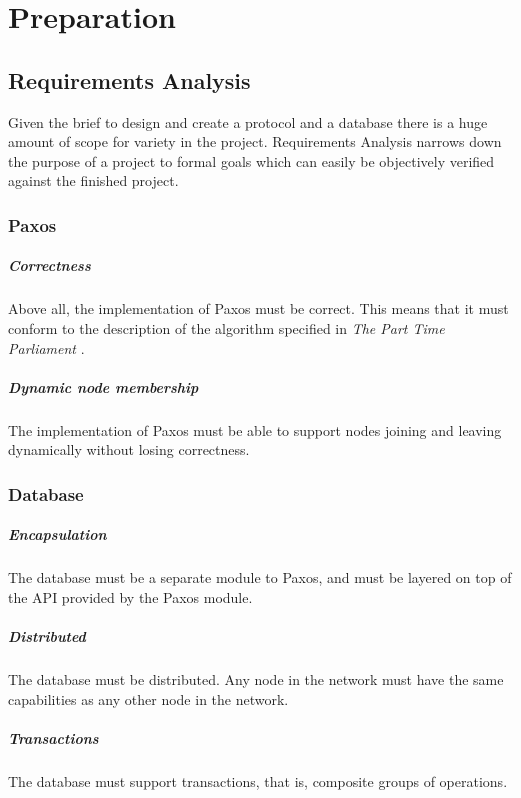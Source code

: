 \documentclass[12pt,twoside,notitlepage]{report}
\begin{document}
\chapter{Preparation}

\section{Requirements Analysis}

Given the brief to design and create a protocol and a database there is a huge amount of scope for
variety in the project. Requirements Analysis narrows down the purpose of a project to formal
goals which can easily be objectively verified against the finished project.

\subsection*{Paxos}
\paragraph{Correctness} Above all, the implementation of Paxos must be correct. This means that it
must conform to the description of the algorithm specified in \emph{The Part Time Parliament}
\cite{lamport98}.
\paragraph{Dynamic node membership} The implementation of Paxos must be able to support nodes
joining and leaving dynamically without losing correctness.

\subsection*{Database}
\paragraph{Encapsulation} The database must be a separate module to Paxos, and must be layered on
top of the API provided by the Paxos module.
\paragraph{Distributed} The database must be distributed. Any node in the network must have the
same capabilities as any other node in the network.
\paragraph{Transactions} The database must support transactions, that is, composite groups of operations.
\end{document}
